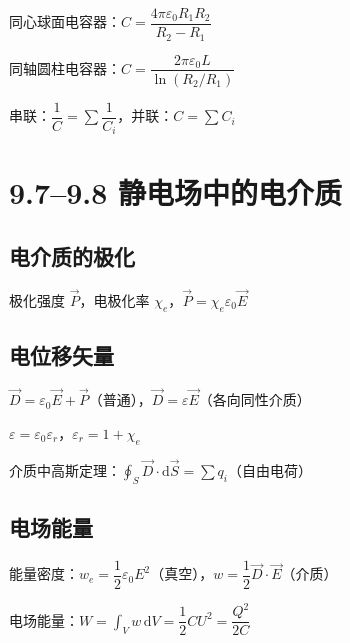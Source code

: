 \documentclass{ctexart}
\begin{document}
同心球面电容器：$C = \dfrac{4\pi\varepsilon_0 R_1 R_2}{R_2 - R_1}$

同轴圆柱电容器：$C = \dfrac{2\pi\varepsilon_0 L}{\ln(R_2/R_1)}$

串联：$\dfrac{1}{C} = \sum \dfrac{1}{C_i}$，并联：$C = \sum C_i$

\section*{9.7--9.8 静电场中的电介质}

\subsection*{电介质的极化}
极化强度 $\vec{P}$，电极化率 $\chi_e$，$\vec{P} = \chi_e\varepsilon_0\vec{E}$

\subsection*{电位移矢量}
$\vec{D} = \varepsilon_0\vec{E} + \vec{P}$（普通），$\vec{D} = \varepsilon\vec{E}$（各向同性介质）

$\varepsilon = \varepsilon_0\varepsilon_r$，$\varepsilon_r = 1 + \chi_e$

介质中高斯定理：$\displaystyle\oint_S \vec{D}\cdot\mathrm{d}\vec{S} = \sum q_i$（自由电荷）

\subsection*{电场能量}
能量密度：$w_e = \dfrac12 \varepsilon_0 E^{2}$（真空），$w = \dfrac12 \vec{D}\cdot\vec{E}$（介质）

电场能量：$W = \displaystyle\int_V w\,\mathrm{d}V = \dfrac12 CU^{2} = \dfrac{Q^{2}}{2C}$
\end{document}
